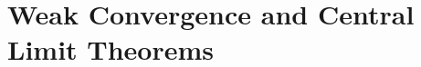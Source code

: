 \documentclass[openany]{book}
\theoremstyle{definition}
\theoremstyle{remark}
\begin{document}
\begin{comment}
\section{Large Deviation Principle}
What we do in this section is actually Chernoff bound. Also refer to Section \ref{sec:Chernoff} for more details.

Assume $X$ has zero mean. Let $\psi_X(\lambda)=\ln \mathbb{E}\left[\exp\left(\lambda X\right)\right]$. One can verify by H\"{o}lder and the Monotone Convergence Theorem that $\psi_X$ is closed convex, and its effective domain is thus an interval containing $0$. Furthermore, $\psi_X(0)=0$, $\psi_X(\lambda)\ge0$.

Let $\psi_X^*(t)$ denote the convex conjugate of $\psi_X$. Then $\psi_X^*(t)\ge0$, $\psi_X^*(0)=0$. Moreover, by Markov's inequality, one can get that for $t\ge0$,
\begin{equation}
    \mathrm{Pr}\left[X\ge t\right]\le\exp\left(-\psi_X^*(t)\right),
\end{equation}
and for $t\le0$,
\begin{equation}
    \mathrm{Pr}\left[X\le t\right]\le\exp\left(-\psi_X^*(t)\right).
\end{equation}

Now consider i.i.d. copies $X_i$ of $X-\mathbb{E}[X]$, and $S_n=\sum_{i=1}^{n}X_i$. We have
\begin{equation*}
    \psi_{S_n}(\lambda)=n\psi_X(\lambda),\quad\psi_{S_n}^*(t)=n\psi^*\left(\frac{t}{n}\right),\quad\textrm{and}\quad \frac{1}{n}\ln P(S_n\ge nt)\le-\psi_X^*(t).
\end{equation*}
Note that $\ln P(S_n\ge nt)$ is a super-additive sequence, thus $\left(\ln P(S_n\ge nt)\right)/n$ converges. Actually one can show that the limit is $-\psi_X^*(t)$.
\end{comment}

\chapter{Weak Convergence and Central Limit Theorems}\label{chp:CLT} %
\end{document}
